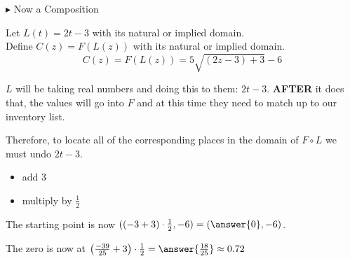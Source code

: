 \documentclass{ximera}
\begin{document}
\begin{example}
$\blacktriangleright$ Now a Composition


Let $L(t) = 2t - 3$ with its natural or implied domain. \\


Define $C(z) = F(L(z))$ with its natural or implied domain. \\

\[
C(z) = F(L(z)) = 5 \sqrt{(2z - 3) + 3} - 6 
\]



$L$ will be taking real numbers and doing this to them: $2t - 3$.  \textbf{AFTER} it does that, the values will go into $F$ and at this time they need to match up to our inventory list.

Therefore, to locate all of the corresponding places in the domain of $F \circ L$ we must undo $2t - 3$.

\begin{itemize}
\item add $3$
\item multiply by $\frac{1}{2}$
\end{itemize}

The starting point is now $((-3 + 3)\cdot \frac{1}{2}, -6) = \left( \answer{0}, -6 \right)$.

The zero is now at $\left( \frac{-39}{25} + 3 \right) \cdot \frac{1}{2} = \answer{\frac{18}{25}} \approx 0.72$








\begin{image}
\end{image}
\end{example}
\end{document}
